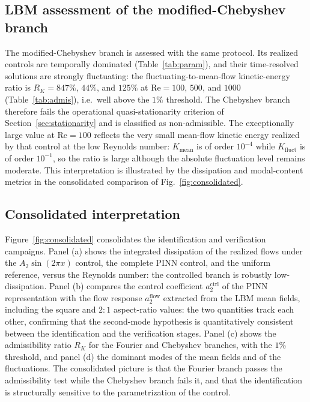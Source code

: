 \documentclass[aip,pof,reprint,superscriptaddress]{revtex4-2}
\newcommand{\re}{\mathrm{Re}}
\begin{document}
\subsection{LBM assessment of the modified-Chebyshev branch}\label{sec:cheb_lbm}

The modified-Chebyshev branch is assessed with the same protocol. Its realized controls are temporally dominated (Table~\ref{tab:param}), and their time-resolved solutions are strongly fluctuating: the fluctuating-to-mean-flow kinetic-energy ratio is $R_K=847\%$, $44\%$, and $125\%$ at $\re=100$, $500$, and $1000$ (Table~\ref{tab:admis}), i.e.\ well above the $1\%$ threshold. The Chebyshev branch therefore fails the operational quasi-stationarity criterion of Section~\ref{sec:stationarity} and is classified as non-admissible. The exceptionally large value at $\re=100$ reflects the very small mean-flow kinetic energy realized by that control at the low Reynolds number: $K_{\mathrm{mean}}$ is of order $10^{-4}$ while $K_{\mathrm{fluct}}$ is of order $10^{-1}$, so the ratio is large although the absolute fluctuation level remains moderate. This interpretation is illustrated by the dissipation and modal-content metrics in the consolidated comparison of Fig.~\ref{fig:consolidated}.

\subsection{Consolidated interpretation}\label{sec:consolidated}

Figure~\ref{fig:consolidated} consolidates the identification and verification campaigns. Panel (a) shows the integrated dissipation of the realized flows under the $A_2\sin(2\pi x)$ control, the complete PINN control, and the uniform reference, versus the Reynolds number: the controlled branch is robustly low-dissipation. Panel (b) compares the control coefficient $a_2^{\mathrm{ctrl}}$ of the PINN representation with the flow response $a_2^{\mathrm{flow}}$ extracted from the LBM mean fields, including the square and $2{:}1$ aspect-ratio values: the two quantities track each other, confirming that the second-mode hypothesis is quantitatively consistent between the identification and the verification stages. Panel (c) shows the admissibility ratio $R_K$ for the Fourier and Chebyshev branches, with the $1\%$ threshold, and panel (d) the dominant modes of the mean fields and of the fluctuations. The consolidated picture is that the Fourier branch passes the admissibility test while the Chebyshev branch fails it, and that the identification is structurally sensitive to the parametrization of the control.
\end{document}
